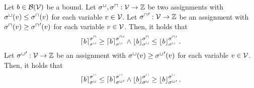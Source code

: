 \begin{theorem}
  Let $b \in \BoundSet(\VSet)$ be a bound.
  Let $\lstate, \ustate: \VSet \rightarrow \mathbb{Z}$ be two assignments with $\lstate(v) \leq \ustate(v)$ for each variable $v \in \VSet$.
  Let $\ustate': \VSet \rightarrow \mathbb{Z}$ be an assignment with $\ustate(v) \geq \ustate'(v)$ for each variable $v \in \VSet$.
  Then, it holds that
  \[ \ueval{b}{\lstate}{\ustate} \geq \ueval{b}{\lstate}{\ustate'} \wedge \leval{b}{\lstate}{\ustate} \leq \leval{b}{\lstate}{\ustate'}. \]
  Let $\lstate': \VSet \rightarrow \mathbb{Z}$ be an assignment with $\lstate(v) \geq \lstate'(v)$ for each variable $v \in \VSet$.
  Then, it holds that
  \[ \ueval{b}{\lstate}{\ustate} \leq \ueval{b}{\lstate'}{\ustate} \wedge \leval{b}{\lstate}{\ustate} \geq \leval{b}{\lstate'}{\ustate}. \]
\end{theorem}
